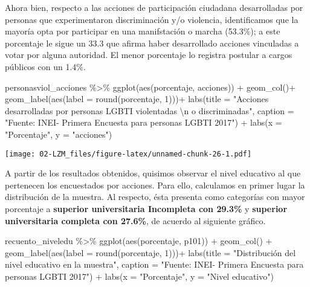 \documentclass[
]{book}
\newenvironment{Shaded}{\begin{snugshade}}{\end{snugshade}}
\newcommand{\AttributeTok}[1]{\textcolor[rgb]{0.77,0.63,0.00}{#1}}
\newcommand{\DecValTok}[1]{\textcolor[rgb]{0.00,0.00,0.81}{#1}}
\newcommand{\FunctionTok}[1]{\textcolor[rgb]{0.00,0.00,0.00}{#1}}
\newcommand{\NormalTok}[1]{#1}
\newcommand{\SpecialCharTok}[1]{\textcolor[rgb]{0.00,0.00,0.00}{#1}}
\newcommand{\StringTok}[1]{\textcolor[rgb]{0.31,0.60,0.02}{#1}}
\theoremstyle{definition}
\theoremstyle{definition}
\theoremstyle{definition}
\theoremstyle{definition}
\theoremstyle{remark}
\begin{document}
Ahora bien, respecto a las acciones de participación ciudadana desarrolladas por personas que experimentaron discriminación y/o violencia, identificamos que la mayoría opta por participar en una manifstación o marcha (53.3\%); a este porcentaje le sigue un 33.3 que afirma haber desarrollado acciones vinculadas a votar por alguna autoridad. El menor porcentaje lo registra postular a cargos públicos con un 1.4\%.

\begin{Shaded}
\begin{Highlighting}[]
\NormalTok{personasviol\_acciones }\SpecialCharTok{\%\textgreater{}\%} 
  \FunctionTok{ggplot}\NormalTok{(}\FunctionTok{aes}\NormalTok{(porcentaje, acciones)) }\SpecialCharTok{+}
  \FunctionTok{geom\_col}\NormalTok{()}\SpecialCharTok{+}
  \FunctionTok{geom\_label}\NormalTok{(}\FunctionTok{aes}\NormalTok{(}\AttributeTok{label =} \FunctionTok{round}\NormalTok{(porcentaje, }\DecValTok{1}\NormalTok{)))}\SpecialCharTok{+}
    \FunctionTok{labs}\NormalTok{(}\AttributeTok{title =} \StringTok{"Acciones desarrolladas por personas LGBTI violentadas }\SpecialCharTok{\textbackslash{}n}\StringTok{ o discriminadas"}\NormalTok{, }
       \AttributeTok{caption =} \StringTok{"Fuente: INEI{-} Primera Encuesta para personas LGBTI 2017"}\NormalTok{) }\SpecialCharTok{+}
  \FunctionTok{labs}\NormalTok{(}\AttributeTok{x =} \StringTok{"Porcentaje"}\NormalTok{,}
       \AttributeTok{y =} \StringTok{"acciones"}\NormalTok{)}
\end{Highlighting}
\end{Shaded}

\texttt{[image: 02-LZM\_files/figure-latex/unnamed-chunk-26-1.pdf]}

A partir de los resultados obtenidos, quisimos observar el nivel educativo al que pertenecen los encuestados por acciones. Para ello, calculamos en primer lugar la distribución de la muestra. Al respecto, ésta presenta como categorías con mayor porcentaje a \textbf{superior universitaria Incompleta con 29.3\%} y \textbf{superior universitaria completa con 27.6\%}, de acuerdo al siguiente gráfico.

\begin{Shaded}
\begin{Highlighting}[]
\NormalTok{recuento\_niveledu }\SpecialCharTok{\%\textgreater{}\%} 
  \FunctionTok{ggplot}\NormalTok{(}\FunctionTok{aes}\NormalTok{(porcentaje, p101)) }\SpecialCharTok{+}
  \FunctionTok{geom\_col}\NormalTok{() }\SpecialCharTok{+}
  \FunctionTok{geom\_label}\NormalTok{(}\FunctionTok{aes}\NormalTok{(}\AttributeTok{label =} \FunctionTok{round}\NormalTok{(porcentaje, }\DecValTok{1}\NormalTok{)))}\SpecialCharTok{+}
  \FunctionTok{labs}\NormalTok{(}\AttributeTok{title =} \StringTok{"Distribución del nivel educativo en la muestra"}\NormalTok{, }
       \AttributeTok{caption =} \StringTok{"Fuente: INEI{-} Primera Encuesta para personas LGBTI 2017"}\NormalTok{) }\SpecialCharTok{+}
  \FunctionTok{labs}\NormalTok{(}\AttributeTok{x =} \StringTok{"Porcentaje"}\NormalTok{,}
       \AttributeTok{y =} \StringTok{"Nivel educativo"}\NormalTok{)}
\end{Highlighting}
\end{Shaded}
\end{document}
